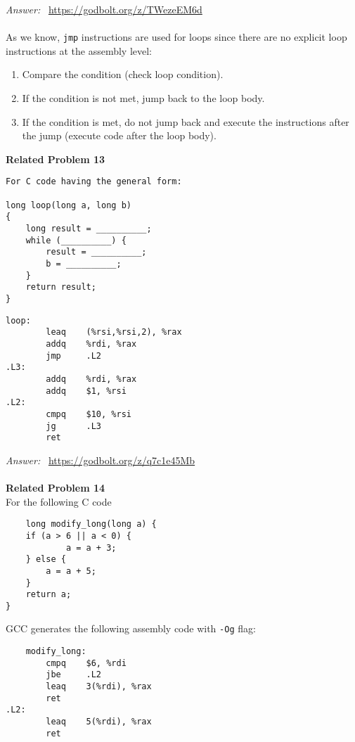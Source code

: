 \noindent\textit{Answer: }~\url{https://godbolt.org/z/TWezeEM6d} \\
\\
As we know, \texttt{jmp} instructions are used for loops since there are no 
explicit loop instructions at the assembly level:

\begin{enumerate}
    \item Compare the condition (check loop condition).
    \item If the condition is not met, jump back to the loop body.
    \item If the condition is met, do not jump back and execute the instructions 
    after the jump (execute code after the loop body).
\end{enumerate}


\noindent\textbf{Related Problem 13} \\
\begin{verbatim}
For C code having the general form:

long loop(long a, long b)
{
    long result = __________;
    while (__________) {
        result = __________;
        b = __________;
    }
    return result;
}
\end{verbatim}

\begin{verbatim}
loop:
        leaq    (%rsi,%rsi,2), %rax
        addq    %rdi, %rax
        jmp     .L2
.L3:
        addq    %rdi, %rax
        addq    $1, %rsi
.L2:
        cmpq    $10, %rsi
        jg      .L3
        ret
\end{verbatim} 

\noindent\textit{Answer: }~\url{https://godbolt.org/z/q7c1e45Mb} \\
\\
\noindent\textbf{Related Problem 14} \\
For the following C code
\begin{verbatim}
    long modify_long(long a) {
    if (a > 6 || a < 0) {
            a = a + 3;
    } else {
        a = a + 5;
    }
    return a;
}
\end{verbatim}
GCC generates the following assembly code with \texttt{-Og} flag:
\begin{verbatim}
    modify_long:
        cmpq    $6, %rdi
        jbe     .L2
        leaq    3(%rdi), %rax
        ret
.L2:
        leaq    5(%rdi), %rax
        ret
\end{verbatim}

